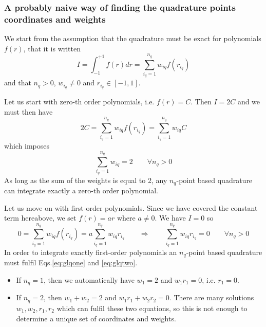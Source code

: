 \subsubsection{A probably naive way of finding the quadrature points coordinates and weights}

We start from the assumption that the quadrature must be exact for polynomials $f(r)$, that it is 
written
\[
I= \int_{-1}^{+1} f(r) dr = \sum_{i_q=1}^{n_q} w_{iq} f(r_{i_q}) 
\]
and that $n_q>0$, $w_{i_q}\neq 0$ and $r_{i_q}\in [-1,1]$.

Let us start with zero-th order polynomials, i.e. $f(r)=C$. Then $I=2C$ and we must then 
have 
\[
2C = \sum_{i_q=1}^{n_q} w_{iq} f(r_{i_q})  =  \sum_{i_q=1}^{n_q} w_{iq} C   
\]
which imposes 
\begin{equation}
\boxed{
\sum_{i_q=1}^{n_q} w_{iq} = 2 \qquad \forall n_q>0
}
\label{eq:glqone}
\end{equation}
As long as the sum of the weights is equal to 2, any $n_q$-point based quadrature can 
integrate exactly a zero-th order polynomial. 

Let us move on with first-order polynomials. Since we have covered the constant term hereabove, we
set $f(r)=ar$ where $a\neq 0$. We have $I=0$ so
\begin{equation}
0 = \sum_{i_q=1}^{n_q} w_{iq} f(r_{i_q})  = a \sum_{i_q=1}^{n_q} w_{iq} r_{i_q}
\qquad
\Rightarrow
\qquad
\boxed{
\sum_{i_q=1}^{n_q} w_{iq} r_{i_q} = 0\qquad \forall n_q>0
}
 \label{eq:glqtwo}
\end{equation}
In order to integrate exactly first-order polynomials an $n_q$-point based quadrature must 
fulfil Eqs.\eqref{eq:glqone} and \eqref{eq:glqtwo}.
\begin{itemize}
\item
If $n_q=1$, then we automatically have $w_1=2$ and $w_1 r_1 =0 $, i.e. $r_1=0$.
\item
If $n_q=2$, then $w_1+w_2=2$ and $w_1r_1+w_2r_2 = 0$. There are many solutions $w_1,w_2,r_1,r_2$ which 
can fulfil these two equations, so this is not enough to determine a unique set of coordinates and weights.
\end{itemize}

